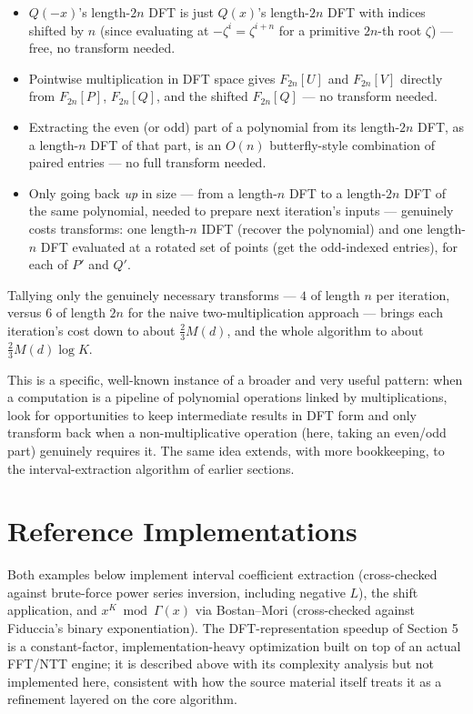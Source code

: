 \documentclass[11pt]{article}
\begin{document}
\begin{itemize}[leftmargin=1.5em]
  \item $Q(-x)$'s length-$2n$ DFT is just $Q(x)$'s length-$2n$ DFT with
        indices shifted by $n$ (since evaluating at $-\zeta^i=\zeta^{i+n}$
        for a primitive $2n$-th root $\zeta$) --- free, no transform
        needed.
  \item Pointwise multiplication in DFT space gives $F_{2n}[U]$ and
        $F_{2n}[V]$ directly from $F_{2n}[P]$, $F_{2n}[Q]$, and the
        shifted $F_{2n}[Q]$ --- no transform needed.
  \item Extracting the even (or odd) part of a polynomial from its
        length-$2n$ DFT, as a length-$n$ DFT of that part, is an $O(n)$
        butterfly-style combination of paired entries --- no full
        transform needed.
  \item Only going back \emph{up} in size --- from a length-$n$ DFT to a
        length-$2n$ DFT of the same polynomial, needed to prepare next
        iteration's inputs --- genuinely costs transforms: one length-$n$
        IDFT (recover the polynomial) and one length-$n$ DFT evaluated at
        a rotated set of points (get the odd-indexed entries), for each
        of $P'$ and $Q'$.
\end{itemize}

Tallying only the genuinely necessary transforms --- $4$ of length $n$
per iteration, versus $6$ of length $2n$ for the naive two-multiplication
approach --- brings each iteration's cost down to about
$\tfrac23 M(d)$, and the whole algorithm to about
$\tfrac23 M(d)\log K$.

\begin{notebox}
This is a specific, well-known instance of a broader and very useful
pattern: when a computation is a pipeline of polynomial operations linked
by multiplications, look for opportunities to keep intermediate results
in DFT form and only transform back when a non-multiplicative operation
(here, taking an even/odd part) genuinely requires it. The same idea
extends, with more bookkeeping, to the interval-extraction algorithm of
earlier sections.
\end{notebox}

\section{Reference Implementations}
Both examples below implement interval coefficient extraction
(cross-checked against brute-force power series inversion, including
negative $L$), the shift application, and $x^K \bmod \Gamma(x)$ via
Bostan--Mori (cross-checked against Fiduccia's binary exponentiation).
The DFT-representation speedup of Section 5 is a constant-factor,
implementation-heavy optimization built on top of an actual FFT/NTT
engine; it is described above with its complexity analysis but not
implemented here, consistent with how the source material itself treats
it as a refinement layered on the core algorithm.
\end{document}
